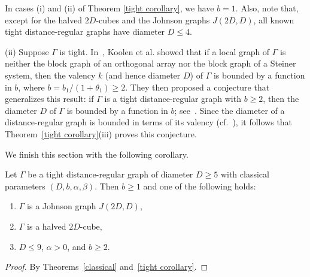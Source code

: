 \begin{rema}
 In cases (i) and (ii) of Theorem \ref{tight corollary}, we have $b = 1$. Also, note that, except for the halved $2D$-cubes and the Johnson graphs $J(2D, D)$, all known tight distance-regular graphs have diameter $D \leqslant 4$.
 
(ii) Suppose $\Gamma$ is tight. 
In~\cite[Theorem 1.3]{KLLLLT2023+}, Koolen et al. showed that if a local graph of $\Gamma$ is neither the block graph of an orthogonal array nor the block graph of a Steiner system, then the valency $k$ (and hence diameter $D$) of $\Gamma$ is bounded by a function in $b$, where $b=b_1/(1+\theta_1) \geqslant 2$. 
They then proposed a conjecture that generalizes this result: if $\Gamma$ is a tight distance-regular graph with $b \geqslant 2$, then the diameter $D$ of $\Gamma$ is bounded by a function in $b$; see~\cite[Conjecture 28]{KLLLLT2023+}. 
Since the diameter of a distance-regular graph is bounded in terms of its valency (cf.~\cite[Section~4]{BDKM}), it follows that Theorem~\ref{tight corollary}(iii) proves this conjecture.
\end{rema}

We finish this section with the following corollary.
\begin{coro}
Let $\Gamma$ be a tight distance-regular graph of diameter $D \geqslant 5$ with classical parameters $(D, b, \alpha, \beta)$. 
Then $b \geqslant 1$ and one of the following holds:
\begin{enumerate}[\normalfont(i)]
  \item $\Gamma$ is a Johnson graph $J(2D,D)$,
  \item $\Gamma$ is a halved $2D$-cube,
  \item $D \leqslant 9$, $\alpha>0$, and $b\geqslant 2$.
\end{enumerate}
\end{coro}
\begin{proof}
By Theorems~\ref{classical} and~\ref{tight corollary}.
\end{proof}
